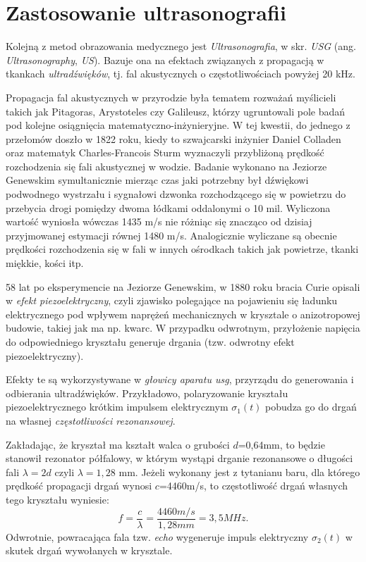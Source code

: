 \section{Zastosowanie ultrasonografii}

Kolejną z metod obrazowania medycznego jest \textit{Ultrasonografia}, w skr. \textit{USG} (ang. \textit{Ultrasonography}, \textit{US}). Bazuje ona na efektach związanych z propagacją w tkankach \textit{ultradźwięków}, tj. fal akustycznych o częstotliwościach powyżej 20 kHz.

Propagacja fal akustycznych w przyrodzie była tematem rozważań myślicieli takich jak Pitagoras, Arystoteles czy Galileusz, którzy ugruntowali pole badań pod kolejne osiągnięcia matematyczno-inżynieryjne. W tej kwestii, do jednego z przełomów doszło w 1822 roku, kiedy to szwajcarski inżynier Daniel Colladen oraz matematyk Charles-Francois Sturm wyznaczyli przybliżoną prędkość rozchodzenia się fali akustycznej w wodzie. Badanie wykonano na Jeziorze Genewskim symultanicznie mierząc czas jaki potrzebny był dźwiękowi podwodnego wystrzału i sygnałowi dzwonka rozchodzącego się w powietrzu do przebycia drogi pomiędzy dwoma łódkami oddalonymi o 10 mil. Wyliczona wartość wyniosła wówczas 1435 m/s nie różniąc się znacząco od dzisiaj przyjmowanej estymacji równej 1480 m/s. Analogicznie wyliczane są obecnie prędkości rozchodzenia się w fali w innych ośrodkach takich jak powietrze, tkanki miękkie, kości itp.

58 lat po eksperymencie na Jeziorze Genewskim, w 1880 roku bracia Curie opisali w \cite{Curie1880} \textit{efekt piezoelektryczny}, czyli zjawisko polegające na pojawieniu się ładunku elektrycznego pod wpływem naprężeń mechanicznych w krysztale o anizotropowej budowie, takiej jak ma np. kwarc. W przypadku odwrotnym, przyłożenie napięcia do odpowiedniego kryształu generuje drgania (tzw. odwrotny efekt piezoelektryczny). 

Efekty te są wykorzystywane w \textit{głowicy aparatu usg}, przyrządu do generowania i odbierania ultradźwięków. Przykładowo, polaryzowanie kryształu piezoelektrycznego krótkim impulsem elektrycznym $\sigma_1(t)$ pobudza go do drgań na własnej \textit{częstotliwości rezonansowej}. 

Zakładając, że kryształ ma kształt walca o grubości $d$=0,64mm, to będzie stanowił rezonator półfalowy, w którym wystąpi drganie rezonansowe o długości fali $\lambda = 2d$ czyli $\lambda = 1,28$ mm. Jeżeli wykonany jest z tytanianu baru, dla którego prędkość propagacji drgań wynosi $c$=4460m/s, to częstotliwość drgań własnych tego kryształu wyniesie:
\begin{equation}
f = \frac{c}{\lambda} = \frac{4460 m/s}{1,28 mm} = 3,5 MHz.
\end{equation}
Odwrotnie, powracająca fala tzw. \textit{echo} wygeneruje impuls elektryczny $\sigma_2(t)$ w skutek drgań wywołanych w krysztale. 
 
